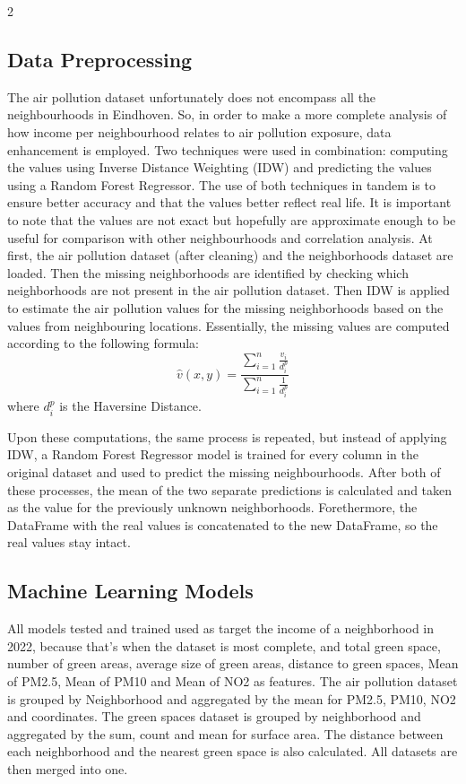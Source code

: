 \documentclass[12pt, a4paper]{article}
\begin{document}
\begin{multicols}{2}
    \subsection{Data Preprocessing}
    The air pollution dataset unfortunately does not encompass all the neighbourhoods in Eindhoven. So, in order to make a more complete analysis of how income per neighbourhood relates to air pollution exposure, data enhancement is employed. Two techniques were used in combination: computing the values using Inverse Distance Weighting (IDW) and predicting the values using a Random Forest Regressor. The use of both techniques in tandem is to ensure better accuracy and that the values better reflect real life. It is important to note that the values are not exact but hopefully are approximate enough to be useful for comparison with other neighbourhoods and correlation analysis.
    At first, the air pollution dataset (after cleaning) and the neighborhoods dataset are loaded. Then the missing neighborhoods are identified by checking which neighborhoods are not present in the air pollution dataset. Then IDW is applied to estimate the air pollution values for the missing neighborhoods based on the values from neighbouring locations. Essentially, the missing values are computed according to the following formula: 
    \begin{equation}
        \hat{v}(x, y) = \frac{\sum_{i=1}^n \frac{v_i}{d_i^p}}{\sum_{i=1}^n \frac{1}{d_i^p}}  
    \end{equation}
    where $d_i^p$ is the Haversine Distance.

    Upon these computations, the same process is repeated, but instead of applying IDW, a Random Forest Regressor model is trained for every column in the original dataset and used to predict the missing neighbourhoods.
    After both of these processes, the mean of the two separate predictions is calculated and taken as the value for the previously unknown neighborhoods. Forethermore, the DataFrame with the real values is concatenated to the new DataFrame, so the real values stay intact.
    \subsection{Machine Learning Models}
    All models tested and trained used as target the income of a neighborhood in 2022, because that's when the dataset is most complete, and total green space, number of green areas, average size of green areas, distance to green spaces, Mean of PM2.5, Mean of PM10 and Mean of NO2 as features. The air pollution dataset is grouped by Neighborhood and aggregated by the mean for PM2.5, PM10, NO2 and coordinates.
    The green spaces dataset is grouped by neighborhood and aggregated by the sum, count and mean for surface area. The distance between each neighborhood and the nearest green space is also calculated.
    All datasets are then merged into one.


\end{multicols}
\end{document}
